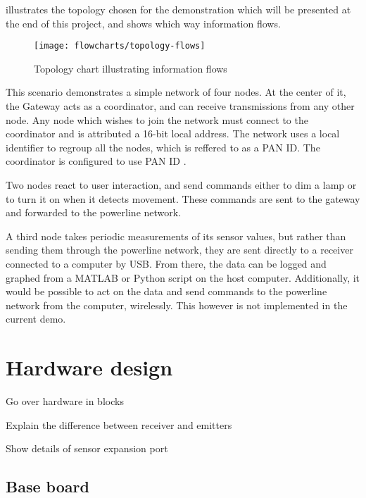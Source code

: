  illustrates the topology chosen for the demonstration
which will be presented at the end of this project, and shows which way
information flows. 


\begin{figure}[h]
  \begin{center}
    \texttt{[image: flowcharts/topology-flows]}
  \end{center}
  \caption{Topology chart illustrating information flows}
  \label{fig:topology-flows}
\end{figure}

This scenario demonstrates a simple network of four nodes. At the center of it,
the Gateway acts as a coordinator, and can receive transmissions from any other
node. Any node which wishes to join the network must connect to the coordinator
and is attributed a 16-bit local address. The network uses a local identifier to
regroup all the nodes, which is reffered to as a PAN ID. The coordinator is
configured to use PAN ID .

Two nodes react to user interaction, and send commands either to dim a lamp or
to turn it on when it detects movement. These commands are sent to the gateway
and forwarded to the powerline network.

A third node takes periodic measurements of its sensor values, but rather than
sending them through the powerline network, they are sent directly to a receiver
connected to a computer by USB. From there, the data can be logged and graphed
from a MATLAB or Python script on the host computer. Additionally, it would be
possible to act on the data and send commands to the powerline network from the
computer, wirelessly. This however is not implemented in the current demo.


\section{Hardware design}

Go over hardware in blocks

Explain the difference between receiver and emitters

Show details of sensor expansion port


\subsection{Base board}

